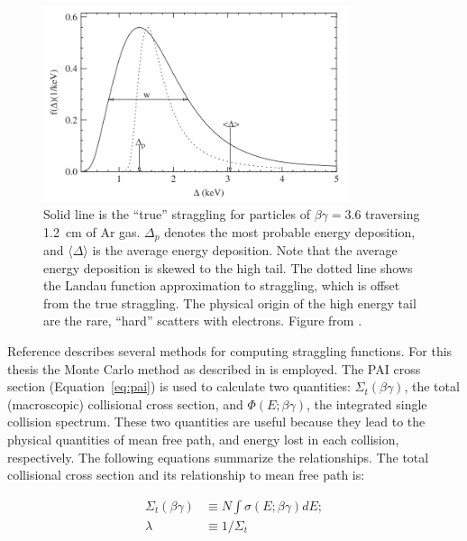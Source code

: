 \begin{figure}[htbp]
\begin{center}
\includegraphics[width=0.8\textwidth]{figures/lips/straggling.png}
\caption{Solid line is the ``true'' straggling for particles of $\beta \gamma = 3.6$ traversing 1.2~cm of Ar gas. $\Delta_{p}$ denotes the most probable energy deposition, and $\langle \Delta \rangle$ is the average energy deposition. Note that the average energy deposition is skewed to the high tail. The dotted line shows the Landau function approximation to straggling, which is offset from the true straggling. The physical origin of the high energy tail are the rare, ``hard'' scatters with electrons. Figure from \cite{Bichsel:2006}. }
\label{fig:straggling}
\end{center}
\end{figure}

Reference \cite{Bichsel:2006} describes several methods for computing straggling functions. For this thesis the Monte Carlo method as described in \cite{Bichsel:2006} is employed. The \ac{PAI} cross section (Equation~\ref{eq:pai}) is used to calculate two quantities: $\Sigma_{t}(\beta \gamma)$, the total (macroscopic) collisional cross section, and $\Phi(E; \beta \gamma)$, the integrated single collision spectrum. These two quantities are useful because they lead to the physical quantities of mean free path, and energy lost in each collision, respectively. The following equations summarize the relationships. The total collisional cross section and its relationship to mean free path is:

\begin{equation}
\begin{split}
\Sigma_{t}(\beta \gamma) &\equiv N \int \sigma(E; \beta \gamma) dE ;\\
\lambda &\equiv 1 / \Sigma_{t}
\end{split}
\end{equation}

